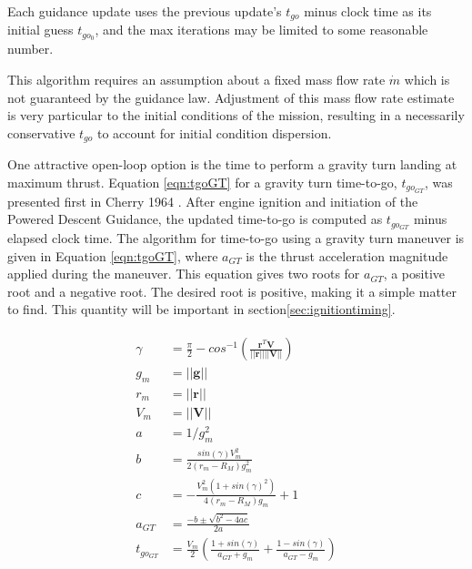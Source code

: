 Each guidance update uses the previous update's $t_{go}$ minus clock time as its initial guess $t_{go_0}$, and the max iterations may be limited to some reasonable number.

This algorithm requires an assumption about a fixed mass flow rate $\dot{m}$ which is not guaranteed by the guidance law. Adjustment of this mass flow rate estimate is very particular to the initial conditions of the mission, resulting in a necessarily conservative $t_{go}$ to account for initial condition dispersion.

One attractive open-loop option is the time to perform a gravity turn landing at maximum thrust. Equation \ref{eqn:tgoGT} for a gravity turn time-to-go, $t_{go_{GT}}$, was presented first in Cherry 1964 \cite{CHERRY}. After engine ignition and initiation of the Powered Descent Guidance, the updated time-to-go is computed as $t_{go_{GT}}$ minus elapsed clock time. The algorithm for time-to-go using a gravity turn maneuver is given in Equation \ref{eqn:tgoGT}, where $a_{GT}$ is the thrust acceleration magnitude applied during the maneuver. This equation gives two roots for $a_{GT}$, a positive root and a negative root. The desired root is positive, making it a simple matter to find. This quantity will be important in section\:\ref{sec:ignitiontiming}.

\begin{align}
\label{eqn:tgoGT}
\begin{split}
\gamma &= \frac{\pi}{2} - cos^{-1}\left(\frac{\bm{r}^T\bm{V}}{||\bm{r}||||\bm{V} ||} \right) \\
g_m &= ||\bm{g}|| \\
r_m &= ||\bm{r}|| \\
V_m &= ||\bm{V}|| \\
a &= 1/g_m^2 \\
b &= \frac{sin(\gamma)V_m^2}{2(r_m-R_M)g_m^2} \\
c &= -\frac{V_m^2 (1+sin(\gamma)^2)}{4(r_m - R_M)g_m}+1 \\
a_{GT} &= \frac{-b \pm \sqrt{b^2 - 4 a c}}{2 a} \\
t_{go_{GT}} &= \frac{V_m}{2} \left(\frac{1+sin(\gamma)}{a_{GT} + g_m} + \frac{1-sin(\gamma)}{a_{GT} - g_m} \right)
\end{split}
\end{align}


